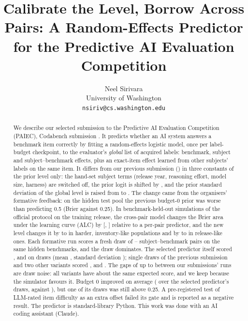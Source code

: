 \documentclass{article}
\title{Calibrate the Level, Borrow Across Pairs: A Random-Effects Predictor for the Predictive AI Evaluation Competition}
\author{%
  Neel Sirivara\\
  University of Washington\\
  \texttt{nsiriv@cs.washington.edu}
}
\begin{document}
\maketitle

\begin{abstract}
We describe our selected submission to the Predictive AI Evaluation Competition (PAIEC), Codabench submission \SelId. It predicts whether an AI system answers a benchmark item correctly by fitting a random-effects logistic model, once per label-budget checkpoint, to the evaluator's \emph{global} list of acquired labels: benchmark, subject and subject--benchmark effects, plus an exact-item effect learned from other subjects' labels on the same item. It differs from our previous submission (\FmShipId) in three constants of the prior level only: the hand-set subject terms (release year, reasoning effort, model size, harness) are switched off, the prior logit is shifted by \SelIntercept, and the prior standard deviation of the global level is raised from \ShipTauMu{} to \SelTauMu. The change came from the organisers' formative feedback: on the hidden test pool the previous budget-0 prior was worse than predicting 0.5 (Brier \FmShipBZero{} against 0.25). In benchmark-held-out simulations of the official protocol on the training release, the cross-pair model changes the Brier area under the learning curve (ALC) by \XpCADiffSZeroMean{} [\XpCADiffSZeroLo, \XpCADiffSZeroHi] relative to a per-pair predictor, and the new level changes it by \DdSelGainBest{} to \DdSelGainWorstHidden{} in harder, inventory-like populations and by \DdSelCostMin{} to \DdSelCostMax{} in release-like ones. Each formative run scores a fresh draw of \FmNPairsMin--\FmNPairsMax{} subject--benchmark pairs on the same \FmNBenchAll{} hidden benchmarks, and the draw dominates. The selected predictor itself scored \SdDrawOneAlc, \SdDrawTwoAlc{} and \SdDrawThreeAlc{} on \SdN{} draws (mean \SdAlcMean, standard deviation \SdAlcSd); single draws of the previous submission and two other variants scored \FmShipAlc, \FmNosubjAlc{} and \FmMhundAlc. The gaps of up to \FmAlcRange{} between our submissions' runs are draw noise: all variants have about the same expected score, and we keep \SelId{} because the simulator favours it. Budget 0 improved on average (\SdBZeroMean{} over the selected predictor's draws, against \FmShipBZero), but one of its draws was still above 0.25. A pre-registered test of LLM-rated item difficulty as an extra offset failed its gate and is reported as a negative result. The predictor is standard-library Python. This work was done with an AI coding assistant (Claude).
\end{abstract}
\end{document}
